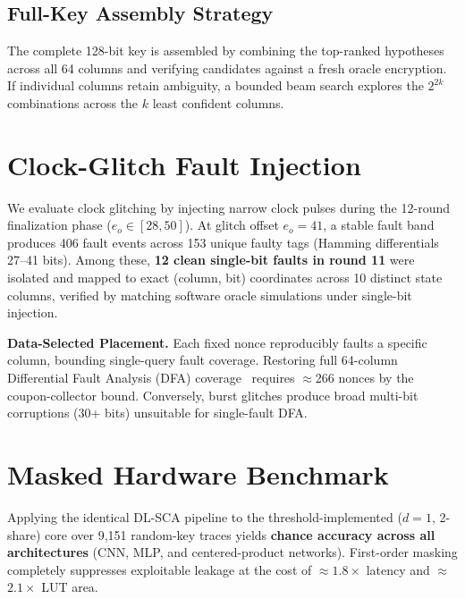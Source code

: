 \documentclass[conference]{IEEEtran}
\begin{document}
\subsection{Full-Key Assembly Strategy}
The complete 128-bit key is assembled by combining the top-ranked hypotheses across all 64 columns and verifying candidates against a fresh oracle encryption. If individual columns retain ambiguity, a bounded beam search explores the $2^{2k}$ combinations across the $k$ least confident columns.

\section{Clock-Glitch Fault Injection}
We evaluate clock glitching by injecting narrow clock pulses during the 12-round finalization phase ($e_o \in [28,50]$). 
At glitch offset $e_o{=}41$, a stable fault band produces 406 fault events across 153 unique faulty tags (Hamming differentials 27--41 bits). Among these, \textbf{12 clean single-bit faults in round 11} were isolated and mapped to exact (column, bit) coordinates across 10 distinct state columns, verified by matching software oracle simulations under single-bit injection.

\textbf{Data-Selected Placement.} Each fixed nonce reproducibly faults a specific column, bounding single-query fault coverage. Restoring full 64-column Differential Fault Analysis (DFA) coverage~\cite{dobraunig2017} requires $\approx$266 nonces by the coupon-collector bound. Conversely, burst glitches produce broad multi-bit corruptions (30+ bits) unsuitable for single-fault DFA.

\section{Masked Hardware Benchmark}
Applying the identical DL-SCA pipeline to the threshold-implemented ($d{=}1$, 2-share) core over 9{,}151 random-key traces yields \textbf{chance accuracy across all architectures} (CNN, MLP, and centered-product networks). First-order masking completely suppresses exploitable leakage at the cost of $\approx$$1.8\times$ latency and $\approx$$2.1\times$ LUT area.
\end{document}
